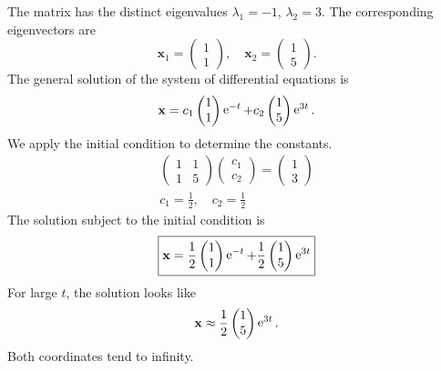 \begin{Example}
  The matrix has the distinct eigenvalues $\lambda_1 = -1$, $\lambda_2 = 3$.  The 
  corresponding eigenvectors are 
  \[
  \mathbf{x}_1 = \begin{pmatrix} 1 \\ 1 \end{pmatrix}, \quad
  \mathbf{x}_2 = \begin{pmatrix} 1 \\ 5 \end{pmatrix}.
  \]
  The general solution of the system of differential equations is
  \[
  \mathbf{x} = 
  c_1 \begin{pmatrix} 1 \\ 1 \end{pmatrix} \mathop{\mathrm{e}}\nolimits^{-t}
  + c_2 \begin{pmatrix} 1 \\ 5 \end{pmatrix} \mathop{\mathrm{e}}\nolimits^{3 t}.
  \]
  We apply the initial condition to determine the constants.
  \begin{gather*}
    \begin{pmatrix}
      1 & 1 \\
      1 & 5
    \end{pmatrix}
    \begin{pmatrix}
      c_1 \\
      c_2
    \end{pmatrix}
    =
    \begin{pmatrix}
      1 \\
      3
    \end{pmatrix} \\
    c_1 = \frac{1}{2}, \quad c_2 = \frac{1}{2}
  \end{gather*}
  The solution subject to the initial condition is
  \[
  \boxed{
    \mathbf{x} = 
    \frac{1}{2} \begin{pmatrix} 1 \\ 1 \end{pmatrix} \mathop{\mathrm{e}}\nolimits^{-t}
    + \frac{1}{2} \begin{pmatrix} 1 \\ 5 \end{pmatrix} \mathop{\mathrm{e}}\nolimits^{3 t}
    }
  \]
  For large $t$, the solution looks like
  \[
  \mathbf{x} \approx \frac{1}{2} \begin{pmatrix} 1 \\ 5 \end{pmatrix} \mathop{\mathrm{e}}\nolimits^{3 t}.
  \]
  Both coordinates tend to infinity.


\end{Example}
